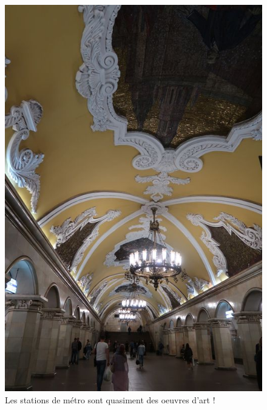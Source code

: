 \begin{figure}
\centering
\includegraphics{images/20180603_metro.JPG}
\caption{Les stations de métro sont quasiment des oeuvres d'art !}
\end{figure}

